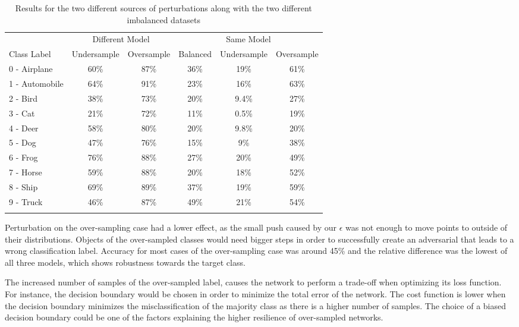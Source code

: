 \documentclass[runningheads,a4paper]{llncs}
\begin{document}
\begin{table}
	\centering
	
	\begin{tabular}{lccccc}
		\toprule
		&\multicolumn{2}{c}{Different Model}
		&\multicolumn{3}{c}{Same Model}
		\\\cmidrule(r){2-3}\cmidrule(l){4-6}
		Class Label &Undersample &Oversample &Balanced &Undersample &Oversample \\
		\midrule
		0 - Airplane &60\%& 87\% &36\%& 19\%    & 61\% \\
		1 - Automobile &64\%& 91\% &23\%& 16\%    & 63\% \\
		2 - Bird &38\%& 73\% &20\%& 9.4\%    & 27\% \\
		3 - Cat &21\%& 72\% &11\%& 0.5\%    & 19\% \\
		4 - Deer &58\%& 80\% &20\%& 9.8\%    & 20\% \\
		5 - Dog &47\%& 76\% &15\%& 9\%    & 38\% \\
		6 - Frog &76\%& 88\% &27\%& 20\%    & 49\% \\
		7 - Horse &59\%& 88\% &20\%& 18\%    & 52\% \\
		8 - Ship &69\%& 89\% &37\%& 19\%    & 59\% \\
		9 - Truck &46\%& 87\% &49\%& 21\%    & 54\% \\
		\bottomrule
		\hfill
	\end{tabular}
	\caption{Results for the two different sources of perturbations along with the two different imbalanced datasets}
	\label{tbl:results}
\end{table}

Perturbation on the over-sampling case had a lower effect, as the small push caused by our $\epsilon$ was not enough to move points to outside of their distributions. Objects of the over-sampled classes would need bigger steps in order to successfully create an adversarial that leads to a wrong classification label. Accuracy for most cases of the over-sampling case was around 45\% and the relative difference was the lowest of all three models, which shows robustness towards the target class. 

The increased number of samples of the over-sampled label, causes the network to perform a trade-off when optimizing its loss function. For instance, the decision boundary would be chosen in order to minimize the total error of the network. The cost function is lower when the decision boundary minimizes the misclassification of the majority class as there is a higher number of samples. The choice of a biased decision boundary could be one of the factors explaining the higher resilience of over-sampled networks.
\end{document}
